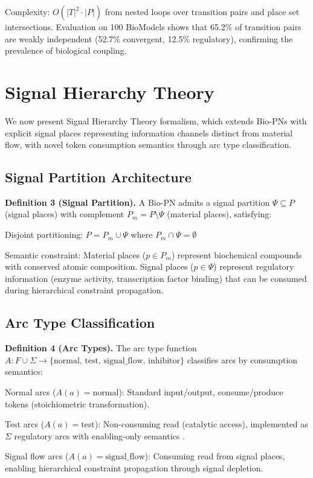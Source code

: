 \documentclass[twocolumn,11pt]{article}
\begin{document}
Complexity: $O(|T|^2 \cdot |P|)$ from nested loops over transition pairs and place set intersections. Evaluation on 100 BioModels \cite{Malik2020} shows that 65.2\% of transition pairs are weakly independent (52.7\% convergent, 12.5\% regulatory), confirming the prevalence of biological coupling.

\section{Signal Hierarchy Theory}

We now present Signal Hierarchy Theory formalism, which extends Bio-PNs with explicit signal places representing information channels distinct from material flow, with novel token consumption semantics through arc type classification.

\subsection{Signal Partition Architecture}

\textbf{Definition 3 (Signal Partition).} A Bio-PN admits a signal partition $\Psi \subseteq P$ (signal places) with complement $P_m = P \setminus \Psi$ (material places), satisfying:

Disjoint partitioning: $P = P_m \cup \Psi$ where $P_m \cap \Psi = \emptyset$

Semantic constraint: Material places ($p \in P_m$) represent biochemical compounds with conserved atomic composition. Signal places ($p \in \Psi$) represent regulatory information (enzyme activity, transcription factor binding) that can be consumed during hierarchical constraint propagation.

\subsection{Arc Type Classification}

\textbf{Definition 4 (Arc Types).} The arc type function $A: F \cup \Sigma \rightarrow \{\text{normal, test, signal\_flow, inhibitor}\}$ classifies arcs by consumption semantics:

Normal arcs ($A(a) = \text{normal}$): Standard input/output, consume/produce tokens (stoichiometric transformation).

Test arcs ($A(a) = \text{test}$): Non-consuming read (catalytic access), implemented as $\Sigma$ regulatory arcs with enabling-only semantics \cite{Heiner2008}.

Signal flow arcs ($A(a) = \text{signal\_flow}$): Consuming read from signal places, enabling hierarchical constraint propagation through signal depletion.
\end{document}
